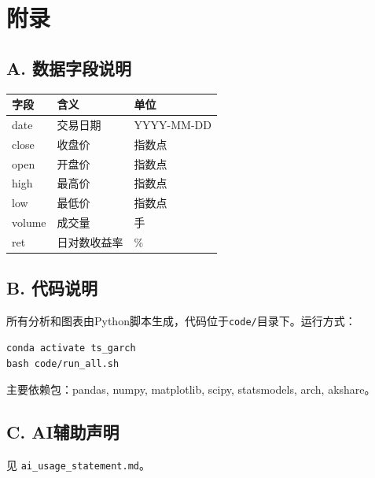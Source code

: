\documentclass[11pt,a4paper]{article}
\begin{document}
\newpage
\section*{附录}

\subsection*{A. 数据字段说明}

\begin{table}[ht]
\centering
\begin{tabular}{lll}
\toprule
字段 & 含义 & 单位 \\
\midrule
date & 交易日期 & YYYY-MM-DD \\
close & 收盘价 & 指数点 \\
open & 开盘价 & 指数点 \\
high & 最高价 & 指数点 \\
low & 最低价 & 指数点 \\
volume & 成交量 & 手 \\
ret & 日对数收益率 & \% \\
\bottomrule
\end{tabular}
\end{table}

\subsection*{B. 代码说明}

所有分析和图表由Python脚本生成，代码位于\texttt{code/}目录下。运行方式：

\begin{verbatim}
conda activate ts_garch
bash code/run_all.sh
\end{verbatim}

主要依赖包：pandas, numpy, matplotlib, scipy, statsmodels, arch, akshare。

\subsection*{C. AI辅助声明}

见 \texttt{ai\_usage\_statement.md}。
\end{document}

